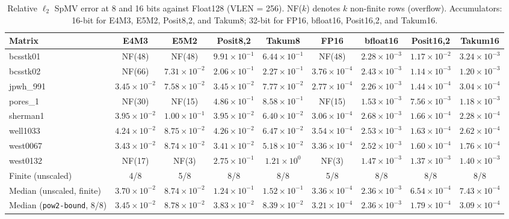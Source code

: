 \begin{table}[t]
\caption{Relative $\ell_2$ SpMV error at 8 and 16 bits against Float128 (VLEN = 256). NF($k$) denotes $k$ non-finite rows (overflow). Accumulators: 16-bit for E4M3, E5M2, Posit8,2, and Takum8; 32-bit for FP16, bfloat16, Posit16,2, and Takum16.}
\label{tab:precisao816}
\centering
\scriptsize
\setlength{\tabcolsep}{3.2pt}
\renewcommand{\arraystretch}{0.96}
\begin{tabular}{@{}lcccccccc@{}}
\toprule
Matrix & E4M3 & E5M2 & Posit8,2 & Takum8 & FP16 & bfloat16 & Posit16,2 & Takum16 \\
\midrule
bcsstk01 & NF(48) & NF(48) & $9.91 \times 10^{-1}$ & $6.44 \times 10^{-1}$ & NF(48) & $2.28 \times 10^{-3}$ & $1.17 \times 10^{-2}$ & $3.24 \times 10^{-3}$ \\
bcsstk02 & NF(66) & $7.31 \times 10^{-2}$ & $2.06 \times 10^{-1}$ & $2.27 \times 10^{-1}$ & $3.76 \times 10^{-4}$ & $2.43 \times 10^{-3}$ & $1.14 \times 10^{-3}$ & $1.20 \times 10^{-3}$ \\
jpwh\_991 & $3.45 \times 10^{-2}$ & $7.58 \times 10^{-2}$ & $3.45 \times 10^{-2}$ & $7.77 \times 10^{-2}$ & $2.77 \times 10^{-4}$ & $2.26 \times 10^{-3}$ & $1.44 \times 10^{-4}$ & $3.04 \times 10^{-4}$ \\
pores\_1 & NF(30) & NF(15) & $4.86 \times 10^{-1}$ & $8.58 \times 10^{-1}$ & NF(15) & $1.53 \times 10^{-3}$ & $7.56 \times 10^{-3}$ & $1.18 \times 10^{-3}$ \\
sherman1 & $3.95 \times 10^{-2}$ & $1.00 \times 10^{-1}$ & $3.95 \times 10^{-2}$ & $6.40 \times 10^{-2}$ & $3.06 \times 10^{-4}$ & $2.68 \times 10^{-3}$ & $1.66 \times 10^{-4}$ & $2.28 \times 10^{-4}$ \\
well1033 & $4.24 \times 10^{-2}$ & $8.75 \times 10^{-2}$ & $4.26 \times 10^{-2}$ & $6.47 \times 10^{-2}$ & $3.54 \times 10^{-4}$ & $2.53 \times 10^{-3}$ & $1.63 \times 10^{-4}$ & $2.62 \times 10^{-4}$ \\
west0067 & $3.43 \times 10^{-2}$ & $8.74 \times 10^{-2}$ & $3.41 \times 10^{-2}$ & $5.18 \times 10^{-2}$ & $3.36 \times 10^{-4}$ & $2.52 \times 10^{-3}$ & $1.60 \times 10^{-4}$ & $1.76 \times 10^{-4}$ \\
west0132 & NF(17) & NF(3) & $2.75 \times 10^{-1}$ & $1.21 \times 10^{0}$ & NF(3) & $1.47 \times 10^{-3}$ & $1.37 \times 10^{-3}$ & $1.40 \times 10^{-3}$ \\
\midrule
Finite (unscaled) & 4/8 & 5/8 & 8/8 & 8/8 & 5/8 & 8/8 & 8/8 & 8/8 \\
Median (unscaled, finite) & $3.70 \times 10^{-2}$ & $8.74 \times 10^{-2}$ & $1.24 \times 10^{-1}$ & $1.52 \times 10^{-1}$ & $3.36 \times 10^{-4}$ & $2.36 \times 10^{-3}$ & $6.54 \times 10^{-4}$ & $7.43 \times 10^{-4}$ \\
Median (\texttt{pow2-bound}, 8/8) & $3.45 \times 10^{-2}$ & $8.78 \times 10^{-2}$ & $3.83 \times 10^{-2}$ & $8.39 \times 10^{-2}$ & $3.21 \times 10^{-4}$ & $2.36 \times 10^{-3}$ & $1.79 \times 10^{-4}$ & $3.09 \times 10^{-4}$ \\
\bottomrule
\end{tabular}
\end{table}
